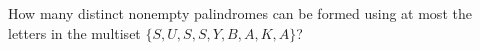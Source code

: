 How many distinct nonempty palindromes can be formed using at most the letters in the multiset $\{S,U,S,S,Y,B,A,K,A\}$?
